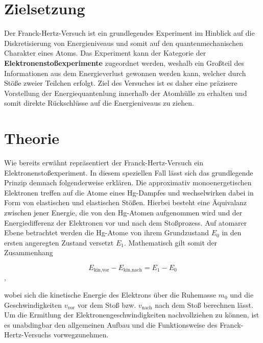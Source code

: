 %

%

\section{Zielsetzung}
\label{sec:Zielsetung}

Der Franck-Hertz-Versuch ist ein grundlegendes Experiment im Hinblick auf die Diskretisierung von Energieniveaus und somit auf den quantenmechanischen 
Charakter eines Atoms. Das Experiment kann der Kategorie der \textbf{Elektronenstoßexperimente} zugeordnet werden, weshalb ein Großteil des Informationen 
aus dem Energieverlust gewonnen werden kann, welcher durch Stöße zweier Teilchen erfolgt. Ziel des Versuches ist es daher eine präzisere Vorstellung 
der Energiequantenlung innerhalb der Atomhülle zu erhalten und somit direkte Rückschlüsse auf die Energieniveaus zu ziehen.

\section{Theorie}
\label{sec:Theorie}

Wie bereits erwähnt repräsentiert der Franck-Hertz-Versuch ein Elektronenstoßexperiment. In diesem speziellen Fall lässt sich das grundlegende Prinzip 
demnach folgenderweise erklären. Die approximativ monoenergetischen Elektronen treffen auf die Atome eines Hg-Dampfes und wechselwirken dabei in Form von 
elastischen und elastischen Stößen. Hierbei besteht eine Äquivalanz zwischen jener Energie, die von den Hg-Atomen aufgenommen wird und der Energiedifferenz 
der Elektronen vor und nach dem Stoßprozess. Auf atomarer Ebene betrachtet werden die Hg-Atome von ihrem Grundzustand $E_0$ in den ersten angeregten
Zustand versetzt $E_1$. Mathematisch gilt somit der Zusammenhang 

\begin{equation*}
    E_\text{kin,vor} - E_\text{kin,nach} = E_1 - E_0
\end{equation*}, 

\noindent wobei sich die kinetische Energie des Elektrons über die Ruhemasse $m_0$ und die Geschwindigkeiten $v_\text{vor}$ vor dem Stoß bzw. $v_\text{nach}$
nach dem Stoß berechnen lässt. Um die Ermitlung der Elektronengeschwindigkeiten nachvollziehen zu können, ist es unabdingbar den allgemeinen Aufbau und die 
Funktionsweise des Franck-Hertz-Versuchs vorwegzunehmen.\\

